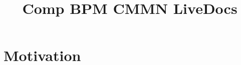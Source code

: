 \documentclass[a4paper,12pt]{article}
\title{Comp BPM CMMN LiveDocs}
\begin{document}
\section{Motivation}


\clearpage
\printnoidxglossaries
\end{document}
